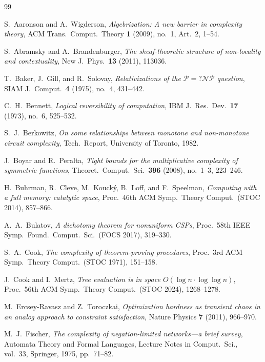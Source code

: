 \documentclass[11pt,reqno]{amsart}
\theoremstyle{definition}
\begin{document}
\begin{thebibliography}{99}

S.~Aaronson and A.~Wigderson,
\emph{Algebrization: A new barrier in complexity theory},
ACM Trans.\ Comput.\ Theory \textbf{1} (2009), no.~1, Art.~2, 1--54.

S.~Abramsky and A.~Brandenburger,
\emph{The sheaf-theoretic structure of non-locality and contextuality},
New J.\ Phys.\ \textbf{13} (2011), 113036.

T.~Baker, J.~Gill, and R.~Solovay,
\emph{Relativizations of the $\mathcal{P} =? \mathcal{NP}$ question},
SIAM J.\ Comput.\ \textbf{4} (1975), no.~4, 431--442.

C.~H.~Bennett,
\emph{Logical reversibility of computation},
IBM J.\ Res.\ Dev.\ \textbf{17} (1973), no.~6, 525--532.

S.~J.~Berkowitz,
\emph{On some relationships between monotone and non-monotone circuit complexity},
Tech.\ Report, University of Toronto, 1982.

J.~Boyar and R.~Peralta,
\emph{Tight bounds for the multiplicative complexity of symmetric functions},
Theoret.\ Comput.\ Sci.\ \textbf{396} (2008), no.~1--3, 223--246.

H.~Buhrman, R.~Cleve, M.~Kouck\'{y}, B.~Loff, and F.~Speelman,
\emph{Computing with a full memory: catalytic space},
Proc.\ 46th ACM Symp.\ Theory Comput.\ (STOC 2014), 857--866.

A.~A.~Bulatov,
\emph{A dichotomy theorem for nonuniform CSPs},
Proc.\ 58th IEEE Symp.\ Found.\ Comput.\ Sci.\ (FOCS 2017), 319--330.

S.~A.~Cook,
\emph{The complexity of theorem-proving procedures},
Proc.\ 3rd ACM Symp.\ Theory Comput.\ (STOC 1971), 151--158.

J.~Cook and I.~Mertz,
\emph{Tree evaluation is in space $O(\log n \cdot \log\log n)$},
Proc.\ 56th ACM Symp.\ Theory Comput.\ (STOC 2024), 1268--1278.

M.~Ercsey-Ravasz and Z.~Toroczkai,
\emph{Optimization hardness as transient chaos in an analog approach to constraint satisfaction},
Nature Physics \textbf{7} (2011), 966--970.

M.~J.~Fischer,
\emph{The complexity of negation-limited networks---a brief survey},
Automata Theory and Formal Languages, Lecture Notes in Comput.\ Sci., vol.~33,
Springer, 1975, pp.~71--82.


\end{thebibliography}
\end{document}
